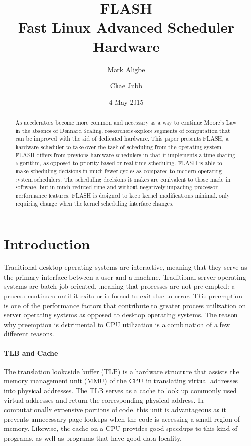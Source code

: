 \documentclass{sig-alternate-10pt}
\title{FLASH\\Fast Linux Advanced Scheduler Hardware}
\author{
	Mark Aligbe \\
	    \email{ma2799@columbia.edu}
	\and
    Chae Jubb \\
        \email{ecj2122@columbia.edu}
}
\date{4 May 2015}
\begin{document}
\maketitle

\begin{abstract}
As accelerators become more common and necessary as a way to continue Moore's Law in the absence of Dennard Scaling, researchers explore segments of computation that can be improved with the aid of dedicated hardware. This paper presents FLASH, a hardware scheduler to take over the task of scheduling from the operating system. FLASH differs from previous hardware schedulers in that it implements a time sharing algorithm, as opposed to priority based or real-time scheduling. FLASH is able to make scheduling decisions in much fewer cycles as compared to modern operating system schedulers. The scheduling decisions it makes are equivalent to those made in software, but in much reduced time and without negatively impacting processor performance features. FLASH is designed to keep kernel modifications minimal, only requiring change when the kernel scheduling interface changes.

\end{abstract}


\section{Introduction}
\label{sec:intro}
Traditional desktop operating systems are interactive, meaning that they serve as the primary interface between a user and a machine. Traditional server operating systems are batch-job oriented, meaning that processes are not pre-empted: a process continues until it exits or is forced to exit due to error. This preemption is one of the performance factors that contribute to greater process utilization on server operating systems as opposed to desktop operating systems. The reason why preemption is detrimental to CPU utilization is a combination of a few different reasons.

\paragraph{TLB and Cache}
The translation lookaside buffer (TLB) is a hardware structure that assists the memory management unit (MMU) of the CPU in translating virtual addresses into physical addresses. The TLB serves as a cache to look up commonly used virtual addresses and return the corresponding physical address. In computationally expensive portions of code, this unit is advantageous as it prevents unnecessary page lookups when the code is accessing a small region of memory. Likewise, the cache on a CPU provides good speedups to this kind of programs, as well as programs that have good data locality.
\end{document}
